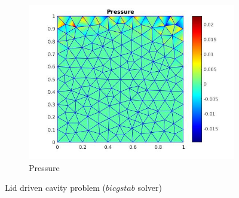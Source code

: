 \documentclass[a4paper,twoside,openright]{book}
\begin{document}
\begin{figure}
\begin{subfigure}{\textwidth}
  \includegraphics[width=0.8\linewidth]{lid_bicgstab_pressure.jpg}
  \caption{Pressure} 
  \label{pressure_stoke_bicgstab_lid}
\end{subfigure}
\caption{Lid driven cavity problem ($bicgstab$ solver)}
\label{stoke_bicgstab_lid}
\end{figure}
\end{document}
